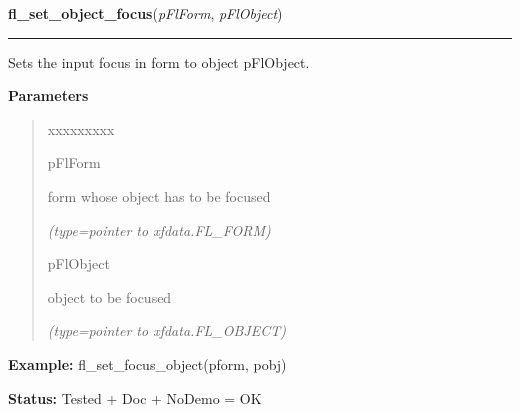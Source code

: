 \hspace{.8\funcindent}\begin{boxedminipage}{\funcwidth}

    \raggedright \textbf{fl\_set\_object\_focus}(\textit{pFlForm}, \textit{pFlObject})

    \vspace{-1.5ex}

    \rule{\textwidth}{0.5\fboxrule}
\setlength{\parskip}{2ex}
    Sets the input focus in form to object pFlObject.

\setlength{\parskip}{1ex}
      \textbf{Parameters}
      \vspace{-1ex}

      \begin{quote}
        \begin{Ventry}{xxxxxxxxx}

          \item[pFlForm]

          form whose object has to be focused

            {\it (type=pointer to xfdata.FL\_FORM)}

          \item[pFlObject]

          object to be focused

            {\it (type=pointer to xfdata.FL\_OBJECT)}

        \end{Ventry}

      \end{quote}

\textbf{Example:} fl\_set\_focus\_object(pform, pobj)



\textbf{Status:} Tested + Doc + NoDemo = OK



    \end{boxedminipage}

    \label{xformslib:flbasic:fl_get_focus_object}

    \vspace{0.5ex}

